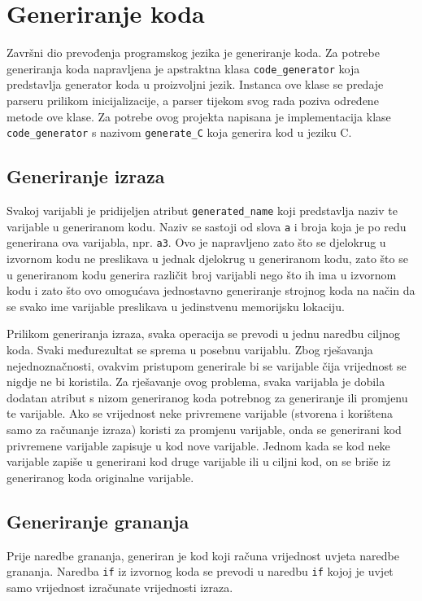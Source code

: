 \documentclass[times, utf8, zavrsni]{fer}
\begin{document}

\section{Generiranje koda}
Završni dio prevođenja programskog jezika je generiranje koda. Za potrebe generiranja koda napravljena je apstraktna klasa \verb|code_generator| koja predstavlja
generator koda u proizvoljni jezik. Instanca ove klase se predaje parseru prilikom inicijalizacije, a parser tijekom svog rada poziva određene metode ove klase.
Za potrebe ovog projekta napisana je implementacija klase \verb|code_generator| s nazivom \verb|generate_C| koja generira kod u jeziku C.

\subsection{Generiranje izraza}
Svakoj varijabli je pridijeljen atribut \verb|generated_name| koji predstavlja naziv te varijable u generiranom kodu. Naziv se sastoji od slova \verb|a| i broja koja je 
po redu generirana ova varijabla, npr. \verb|a3|. Ovo je napravljeno zato što se djelokrug u izvornom kodu ne preslikava u jednak djelokrug u generiranom kodu,
zato što se u generiranom kodu generira različit broj varijabli nego što ih ima u izvornom kodu i zato što ovo omogućava jednostavno generiranje strojnog koda na 
način da se svako ime varijable preslikava u jedinstvenu memorijsku lokaciju.

Prilikom generiranja izraza, svaka operacija se prevodi u jednu naredbu ciljnog koda. Svaki međurezultat se sprema u posebnu varijablu. Zbog rješavanja nejednoznačnosti,
ovakvim pristupom generirale bi se varijable čija vrijednost se nigdje ne bi koristila. Za rješavanje ovog problema, svaka varijabla je dobila dodatan atribut s nizom 
generiranog koda potrebnog za generiranje ili promjenu te varijable. Ako se vrijednost neke privremene varijable (stvorena i korištena samo za računanje izraza) koristi
za promjenu varijable, onda se generirani kod privremene varijable zapisuje u kod nove varijable. Jednom kada se kod neke varijable zapiše u generirani kod druge varijable
ili u ciljni kod, on se briše iz generiranog koda originalne varijable.

\subsection{Generiranje grananja}
Prije naredbe grananja, generiran je kod koji računa vrijednost uvjeta naredbe grananja. Naredba \verb|if| iz izvornog koda se prevodi u naredbu \verb|if| kojoj je uvjet samo vrijednost
izračunate vrijednosti izraza.
\end{document}
